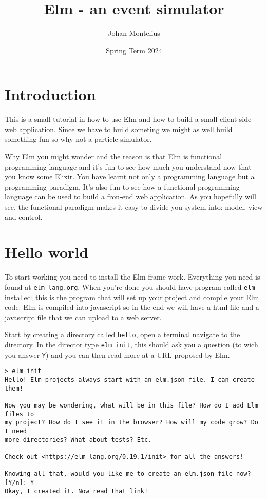 \documentclass[a4paper,11pt]{article}
\begin{document}
\title{Elm - an event simulator}

\author{Johan Montelius}
\date{Spring Term 2024}

\maketitle


\section*{Introduction}

This is a small tutorial in how to use Elm and how to build a small
client side web application. Since we have to build someting we might
as well build something fun so why not a particle simulator.

Why Elm you might wonder and the reason is that Elm is functional
programming language and it's fun to see how much you understand now
that you know some Elixir. You have learnt not only a programming
language but a programming paradigm. It's also fun to see how a
functional programming language can be used to build a fron-end web
application. As you hopefully will see, the functional paradigm makes
it easy to divide you system into: model, view and control. 

\section*{Hello world}

To start working you need to install the Elm frame work. Everything
you need is found at {\tt elm-lang.org}. When you're done you should
have program called {\tt elm} installed; this is the program that will
set up your project and compile your Elm code. Elm is compiled into
javascript so in the end we will have a html file and a javascript
file that we can upload to a web server.


Start by creating a directory called {\tt hello}, open a terminal
navigate to the directory. In the director type {\tt elm init}, this
should ask you a question (to wich you answer {\tt Y}) and you can
then read more at a URL proposed by Elm.

\begin{verbatim}
> elm init 
Hello! Elm projects always start with an elm.json file. I can create them!

Now you may be wondering, what will be in this file? How do I add Elm files to
my project? How do I see it in the browser? How will my code grow? Do I need
more directories? What about tests? Etc.

Check out <https://elm-lang.org/0.19.1/init> for all the answers!

Knowing all that, would you like me to create an elm.json file now? [Y/n]: Y
Okay, I created it. Now read that link!
\end{verbatim}
\end{document}
